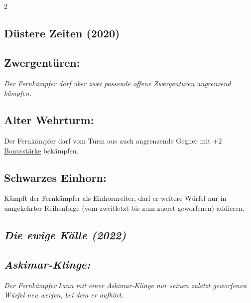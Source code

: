 \documentclass[10pt, a4paper, oneside]{book}
\newcommand{\fan}[1]{\textit{#1}}
\begin{document}
\begin{multicols*}{2}
\begin{bgcolor}[color-dz]
\section{Düstere Zeiten (2020)}

\subsection{Zwergentüren:}

\fan{Der Fernkämpfer darf über zwei passende offene Zwergentüren angrenzend kämpfen.}


\subsection{Alter Wehrturm:}

Der Fernkämpfer darf vom Turm aus auch angrenzende Gegner mit +2 \hyperref[bonusstaerke]{Bonusstärke} bekämpfen.
\supercite{dz-begleitheft}


\subsection{Schwarzes Einhorn:}

Kämpft der Fernkämpfer als Einhornreiter, darf er weitere Würfel nur in umgekehrter Reihenfolge (vom zweitletzt bis zum zuerst geworfenen) addieren.
\supercite{dz-begleitheft}



\end{bgcolor}







\begin{bgcolor}
\section{\fan{Die ewige Kälte (2022)}}

\subsection{\fan{Askimar-Klinge:}}

\fan{Der Fernkämpfer kann mit einer Askimar-Klinge nur seinen zuletzt geworfenen Würfel neu werfen, bei dem er aufhört.}

\end{bgcolor}






\end{multicols*}
\end{document}
